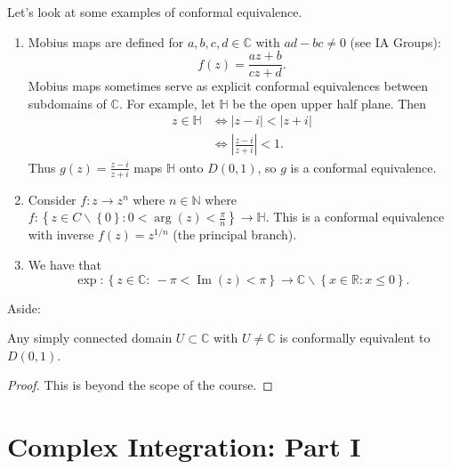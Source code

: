 \documentclass[egregdoesnotlikesansseriftitles,a4paper]{scrartcl}
\begin{document}
\begin{example*}
     Let's look at some examples of conformal equivalence.
      \begin{enumerate}
           \item Mobius maps are defined for $a,b,c,d \in \mathbb{C}$ with $ad-bc \neq 0$ (see IA Groups): \[
           f (z)= \frac{az+b}{cz+d}
           .\] Mobius maps sometimes serve as explicit conformal equivalences between subdomains of $\mathbb{C}$. For example, let $\mathbb{H}$ be the open upper half plane. Then 
           \begin{align*}
                z \in \mathbb{H} &\iff |z-i| < |z+i|\\
                & \iff | \frac{z-i}{z+i}|<1.
           \end{align*}
           Thus $g (z)=\frac{z-i}{z+i}$ maps $\mathbb{H}$ onto $D (0,1)$, so $g$ is a conformal equivalence.
           \item Consider $f: z \rightarrow z^{n}$ where $n \in \mathbb{N}$ where $f: \left\{z \in C \backslash \left\{0\right\}: 0 < \operatorname{arg}(z) < \frac{\pi}{n}\right\} \rightarrow \mathbb{H}$. This is a conformal equivalence with inverse $f (z)=z^{1/n}$ (the principal branch).
           \item We have that \[
           \operatorname{exp}: \left\{z \in \mathbb{C}: \ -\pi < \operatorname{Im}(z)<\pi\right\} \rightarrow \mathbb{C} \backslash \left\{x \in \mathbb{R}: x \leq 0\right\}
           .\]  
      \end{enumerate}
\end{example*}
Aside:
\begin{theorem}
      Any simply connected domain $U \subset \mathbb{C}$ with $U \neq \mathbb{C}$ is conformally equivalent to $D (0,1)$.
\end{theorem}
\begin{proof}
      This is beyond the scope of the course.\footnotemark
\end{proof}
\section{Complex Integration: Part I}
\end{document}
